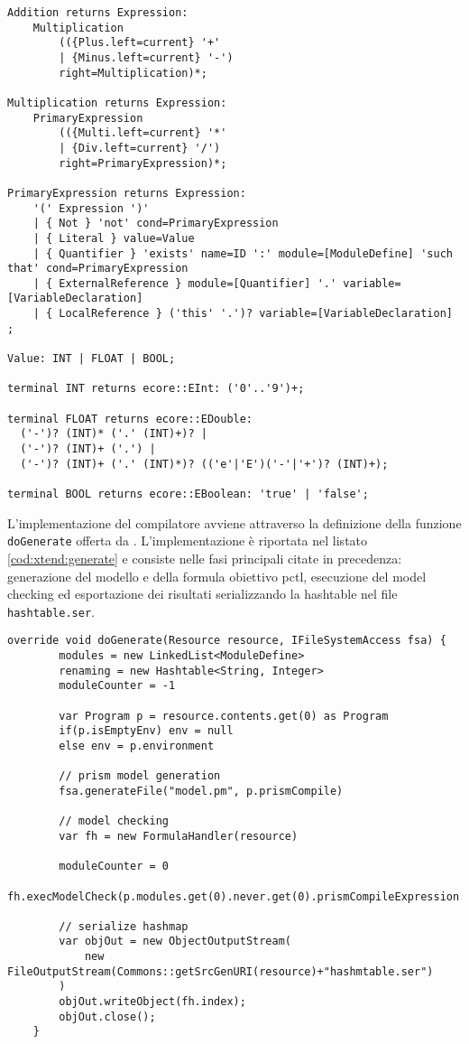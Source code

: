 \begin{lstlisting}[language=xtext,style=eclipse,caption={Sintassi di \acs{lapsa} in \xtext{}},label=code:lapsa:syntax]
Addition returns Expression:
	Multiplication 
		(({Plus.left=current} '+' 
		| {Minus.left=current} '-') 
		right=Multiplication)*;

Multiplication returns Expression:
	PrimaryExpression 
		(({Multi.left=current} '*' 
		| {Div.left=current} '/') 
		right=PrimaryExpression)*;

PrimaryExpression returns Expression:
	'(' Expression ')'
	| { Not } 'not' cond=PrimaryExpression
	| { Literal } value=Value
	| { Quantifier } 'exists' name=ID ':' module=[ModuleDefine] 'such that' cond=PrimaryExpression
	| { ExternalReference } module=[Quantifier] '.' variable=[VariableDeclaration] 
	| { LocalReference } ('this' '.')? variable=[VariableDeclaration]   
;

Value: INT | FLOAT | BOOL;

terminal INT returns ecore::EInt: ('0'..'9')+;

terminal FLOAT returns ecore::EDouble:
  ('-')? (INT)* ('.' (INT)+)? |
  ('-')? (INT)+ ('.') | 
  ('-')? (INT)+ ('.' (INT)*)? (('e'|'E')('-'|'+')? (INT)+);

terminal BOOL returns ecore::EBoolean: 'true' | 'false';
\end{lstlisting}

L'implementazione del compilatore avviene attraverso la definizione della funzione \texttt{doGenerate} offerta da \xtext{}. L'implementazione è riportata nel listato \ref{cod:xtend:generate} e consiste nelle fasi principali citate in precedenza: generazione del modello \prism{} e della formula obiettivo \ac{pctl}, esecuzione del model checking ed esportazione dei risultati serializzando la hashtable nel file \texttt{hashtable.ser}.

\begin{lstlisting}[language=xtend,style=eclipse,caption={Implementazione della funzione di generazione in \xtend{}},label=code:xtend:generate]
	override void doGenerate(Resource resource, IFileSystemAccess fsa) {
		modules = new LinkedList<ModuleDefine>
		renaming = new Hashtable<String, Integer>
		moduleCounter = -1

		var Program p = resource.contents.get(0) as Program
		if(p.isEmptyEnv) env = null
		else env = p.environment

		// prism model generation
		fsa.generateFile("model.pm", p.prismCompile)

		// model checking
		var fh = new FormulaHandler(resource)
		
		moduleCounter = 0
		fh.execModelCheck(p.modules.get(0).never.get(0).prismCompileExpression.toString)
		
		// serialize hashmap
        var objOut = new ObjectOutputStream(
        	new FileOutputStream(Commons::getSrcGenURI(resource)+"hashmtable.ser")
        )
        objOut.writeObject(fh.index);
        objOut.close();
	}
\end{lstlisting}

